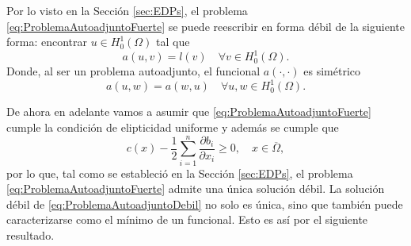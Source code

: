 \documentclass[a4paper,11pt,spanish, twoside, leqno]{tfg-uam}
\theoremstyle{definition}
\begin{document}
Por lo visto en la Sección \ref{sec:EDPs}, el problema \eqref{eq:ProblemaAutoadjuntoFuerte} se puede reescribir en forma débil de la siguiente forma: encontrar $u\in H_0^1(\Omega)$ tal que
\begin{equation}\label{eq:ProblemaAutoadjuntoDebil}
    a(u,v) = l(v) \quad \forall v\in  H_0^1(\Omega).
\end{equation}
Donde, al ser un problema autoadjunto, el funcional $a(\cdot,\cdot)$ es simétrico
\begin{equation*}
    a(u,w) = a(w,u) \quad \forall u,w\in H_0^1(\Omega).
\end{equation*}

De ahora en adelante vamos a asumir que \eqref{eq:ProblemaAutoadjuntoFuerte} cumple la condición de elipticidad uniforme y además se cumple que
\begin{equation*}
    c(x) - \frac{1}{2} \sum_{i=1}^n \frac{\partial b_i}{\partial x_i} \geq 0, \quad x \in \overline{\Omega},
\end{equation*}
por lo que, tal como se estableció en la Sección \ref{sec:EDPs}, el problema \eqref{eq:ProblemaAutoadjuntoFuerte} admite una única solución débil. La solución débil de \eqref{eq:ProblemaAutoadjuntoDebil} no solo es única, sino que también puede caracterizarse como el mínimo de un funcional. Esto es así por el siguiente resultado.
\end{document}
